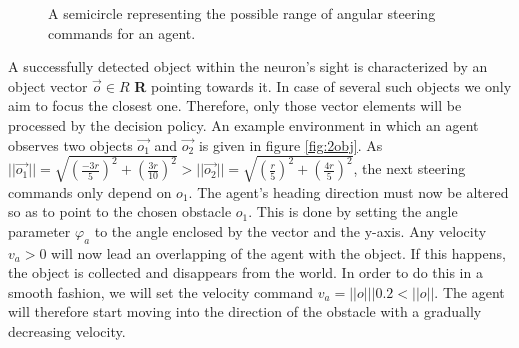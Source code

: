 \documentclass[10pt,a4paper,DIV=11]{scrreprt}
\begin{document}
\begin{center}
\begin{figure}
	\caption{A semicircle representing the possible range of angular steering commands for an agent.}
	\label{fig:acontrol}
\end{figure}
\end{center}

A successfully detected object within the neuron's sight is characterized by an object vector $\overrightarrow{o} \in R$ \textbf{R} pointing towards it. 
In case of several such objects we only aim to focus the closest one. Therefore, only those vector elements will be processed by the decision policy.
An example environment in which an agent observes two objects $\overrightarrow{o_1}$ and $\overrightarrow{o_2}$ is given in figure \ref{fig:2obj}. As
$||\overrightarrow{o_1}|| = \sqrt{(\frac{-3r}{5})^2 + (\frac{3r}{10})^2} > ||\overrightarrow{o_2}|| = \sqrt{(\frac{r}{5})^2 + (\frac{4r}{5})^2}$, the next steering commands only 
depend on $o_1$. The agent's heading direction must now be altered so as to point to the chosen obstacle $o_1$. This is done by setting the angle
parameter $\varphi_a$ to the angle enclosed by the vector and the y-axis. Any velocity $v_a > 0$ will now lead an overlapping of the agent with the
object. If this happens, the object is collected and disappears from the world. In order to do this in a smooth fashion, we will set the velocity
command $v_a = ||o|| | 0.2 < ||o||$. The agent will therefore start moving into the direction of the obstacle with a gradually decreasing velocity.
\end{document}
